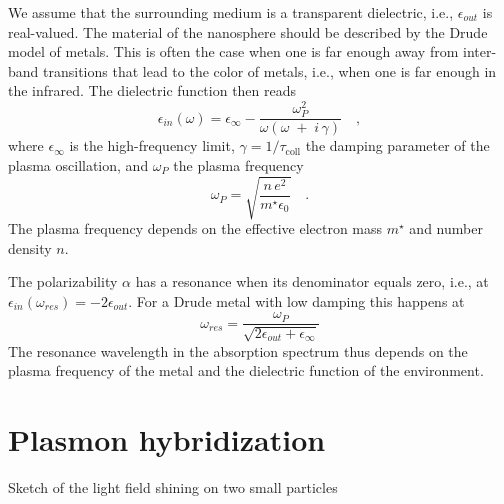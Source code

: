 We  assume that the surrounding  medium  is a transparent dielectric, i.e., 
$\epsilon_{out}$ is real-valued. The material of the nanosphere should be described by the Drude model of metals. This is often the case when one is far enough away from inter-band transitions that lead to the color of metals, i.e., when one is far enough in the infrared. The dielectric function then reads
\begin{equation}
 \epsilon_{in} (\omega) = \epsilon_{\infty} - \frac{\omega_P^2}{ \omega \left(\omega \;
+ \; i\, \gamma \right) } \quad , \label{eq:5_hybrid_drude}
\end{equation}
where $\epsilon_{\infty} $ is the  high-frequency limit,  $\gamma = 1 / \tau_\text{coll} $ the damping parameter of the plasma oscillation, and $\omega_P$ the plasma frequency 
\begin{equation}
\omega_P = \sqrt{\frac{n \, e^2}{m^\star \epsilon_0}} \quad.
\end{equation}
The plasma frequency depends on the effective electron mass $m^\star$ and number density $n$.

The polarizability $\alpha$ has a resonance when its denominator equals zero, i.e., at $\epsilon_{in} (\omega_{res}) = -2 \epsilon_{out}$. For a Drude metal with low damping this happens at
\begin{equation}
\omega_{res} = \frac{\omega_P}{\sqrt{2 \epsilon_{out} + \epsilon_\infty}}
\end{equation}
The resonance wavelength in the absorption spectrum thus depends on 
the plasma frequency of the metal and  the dielectric function of the environment. 




\section{Plasmon hybridization}

\begin{marginfigure}
\caption{Sketch of the light field shining on two small particles}
\end{marginfigure}



